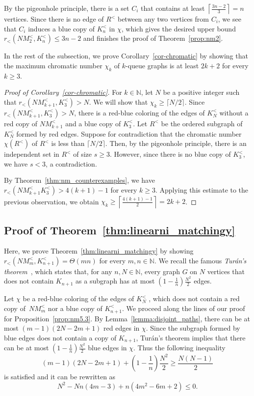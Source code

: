 \documentclass[11pt,a4paper]{article}
\theoremstyle{remark}
\begin{document}
By the pigeonhole principle, there is a set $C_i$ that contains at least $\left \lceil{\frac{3n-2}{3}}\right \rceil = n$ vertices.
Since there is no edge of $R^<$ between any two vertices from $C_i$, we see that $C_i$ induces a blue copy of $K^<_n$ in $\chi$, which gives the desired upper bound $r_<(NM_2^<,K^<_n) \leq 3n-2$ and finishes the proof of Theorem~\ref{prop:nm2}.

In the rest of the subsection, we prove Corollary~\ref{cor-chromatic} by showing that the maximum chromatic number $\chi_k$ of $k$-queue graphs is at least $2k+2$ for every $k \geq 3$.

\begin{proof}[Proof of Corollary~\ref{cor-chromatic}]
For $k \in \mathbb{N}$, let $N$ be a positive integer such that $r_<(NM^<_{k+1},K^<_3) > N$.
We will show that $\chi_k \geq \lceil N/2\rceil$.
Since $r_<(NM^<_{k+1},K^<_3) > N$, there is a red-blue coloring of the edges of $K^<_N$ without a red copy of $NM^<_{k+1}$ and a blue copy of $K^<_3$.
Let $R^<$ be the ordered subgraph of $K^<_N$ formed by red edges.
Suppose for contradiction that the chromatic number $\chi(R^<)$ of $R^<$ is less than $\lceil N/2\rceil$.
Then, by the pigeonhole principle, there is an independent set in $R^<$ of size $s \geq 3$.
However, since there is no blue copy of $K^<_3$, we have $s < 3$, a contradiction.

By Theorem~\ref{thm:nm_counterexamples}, we have $r_<(NM^<_{k+1}K^<_3) > 4(k+1)-1$ for every $k \geq 3$.
Applying this estimate to the previous observation, we obtain $\chi_k \geq \left\lceil \frac{4(k+1)-1}{2} \right\rceil = 2k+2$.
\end{proof}





\subsection{Proof of Theorem~\ref{thm:linearni_matchingy}}

Here, we prove Theorem~\ref{thm:linearni_matchingy} by showing $r_<(NM^<_m,K^<_{n+1}) = \Theta(mn)$ for every $m,n\in\mathbb{N}$.
We recall the famous \emph{Turán's theorem}~\cite{turan}, which states that, for any $n,N\in\mathbb{N}$, every graph $G$ on $N$ vertices that does not contain $K_{n+1}$ as a subgraph has at most
$\left(1-\frac{1}{n}\right)\frac{N^2}{2}$ edges.


Let $\chi$ be a red-blue coloring of the edges of $K^<_N$ , which does not contain a red copy of~$NM^<_m$ nor a blue copy of $K^<_{n+1}$.
We proceed along the lines of our proof for Proposition~\ref{prop:nm5.3}.
By Lemma~\ref{lemma:disjoint_paths}, there can be at most
$(m-1)(2N-2m+1)$ red edges in $\chi$. 
Since the subgraph formed by blue edges does not contain a copy of $K_{n+1}$, Turán's theorem implies that there can be at most 
$\left(1-\frac{1}{n}\right)\frac{N^2}{2}$
blue edges in $\chi$. Thus the following inequality 
\[(m-1)(2N-2m+1) + \left(1-\frac{1}{n}\right)\frac{N^2}{2} \geq \frac{N(N-1)}{2}\] is satisfied and it can be rewritten as
\[N^2 - Nn(4m-3) + n(4m^2-6m+2) \leq 0.\]
\end{document}
